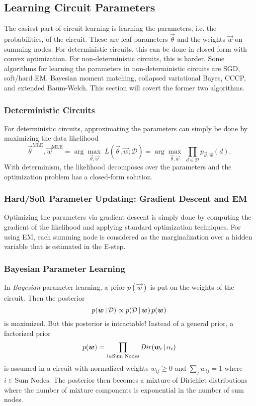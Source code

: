 		\subsection{Learning Circuit Parameters}
			The easiest part of circuit learning is learning the parameters, i.e. the probabilities, of the circuit. These are leaf parameters \(\vec{\theta}\) and the weights \(\vec{w}\) on summing nodes. For deterministic circuits, this can be done in closed form with convex optimization. For non-deterministic circuits, this is harder. Some algorithms for learning the parameters in non-deterministic circuits are SGD, soft/hard EM, Bayesian moment matching, collapsed variational Bayes, CCCP, and extended Baum-Welch. This section will covert the former two algorithms.

			\subsubsection{Deterministic Circuits}
				For deterministic circuits, approximating the parameters can simply be done by maximizing the data likelihood
				\begin{equation}
					\vec{\theta}^\mathrm{MLE}, \vec{w}^\mathrm{MLE}
					= \arg\max_{\vec{\theta}, \vec{w}} \; L(\vec{\theta}, \vec{w}; \mathcal{D})
					= \arg\max_{\vec{\theta}, \vec{w}} \; \prod_{d \in \mathcal{D}} p_{\vec{\theta}, \vec{w}}(d).
				\end{equation}
				With determinism, the likelihood decomposes over the parameters and the optimization problem has a closed-form solution.

			\subsubsection{Hard/Soft Parameter Updating: Gradient Descent and EM}
				Optimizing the parameters via gradient descent is simply done by computing the gradient of the likelihood and applying standard optimization techniques. For using EM, each summing node is considered as the marginalization over a hidden variable that is estimated in the E-step.

			\subsubsection{Bayesian Parameter Learning}
				In \emph{Bayesian} parameter learning, a prior \( p(\vec{w}) \) is put on the weights of the circuit. Then the posterior
				\begin{equation}
					p(\bm{w} \,\vert\, \mathcal{D}) \propto p(\mathcal{D} \,\vert\, \bm{w}) \, p(\bm{w})
				\end{equation}
				is maximized. But this posterior is intractable! Instead of a general prior, a factorized prior
				\begin{equation}
					p(\bm{w}) = \prod_{i \in \text{Sum Nodes}} \mathit{Dir}(\bm{w}_i \,\vert\, \alpha_i)
				\end{equation}
				is assumed in a circuit with normalized weights \( w_{ij} \geq 0 \) and \( \sum_j w_{ij} = 1 \) where \( i \in \text{Sum Nodes} \). The posterior then becomes a mixture of Dirichlet distributions where the number of mixture components is exponential in the number of sum nodes.

